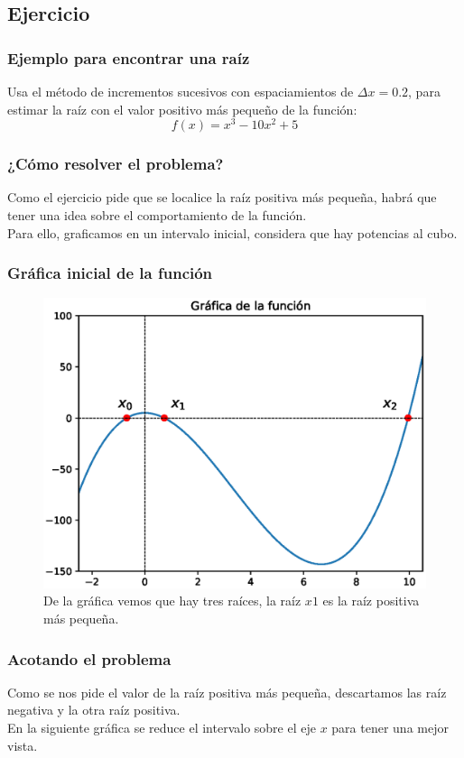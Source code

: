 \subsection{Ejercicio}
\begin{frame}
\frametitle{Ejemplo para encontrar una raíz}
Usa el método de incrementos sucesivos con espaciamientos de $\Delta x= 0.2$, para estimar la raíz con el valor positivo más pequeño de la función:
\[ f(x) = x^{3} - 10 x^{2} + 5\]
\end{frame}
\begin{frame}
\frametitle{¿Cómo resolver el problema?}
Como el ejercicio pide que se localice la raíz positiva más pequeña, habrá que tener una idea sobre el comportamiento de la función.
\\
\bigskip
Para ello, graficamos en un intervalo inicial, considera que hay potencias al cubo.
\end{frame}
\begin{frame}
\frametitle{Gráfica inicial de la función}
\begin{figure}
	\centering
	\includegraphics[scale=0.5]{Imagenes/aprox_sucesivas_2020_01.eps}
	\caption{De la gráfica vemos que hay tres raíces, la raíz $x{1}$ es la raíz positiva más pequeña.} 
\end{figure}
\end{frame}
\begin{frame}
\frametitle{Acotando el problema}
Como se nos pide el valor de la raíz positiva más pequeña, descartamos las raíz negativa y la otra raíz positiva.
\\
\bigskip
En la siguiente gráfica se reduce el intervalo sobre el eje $x$ para tener una mejor vista.
\end{frame}
